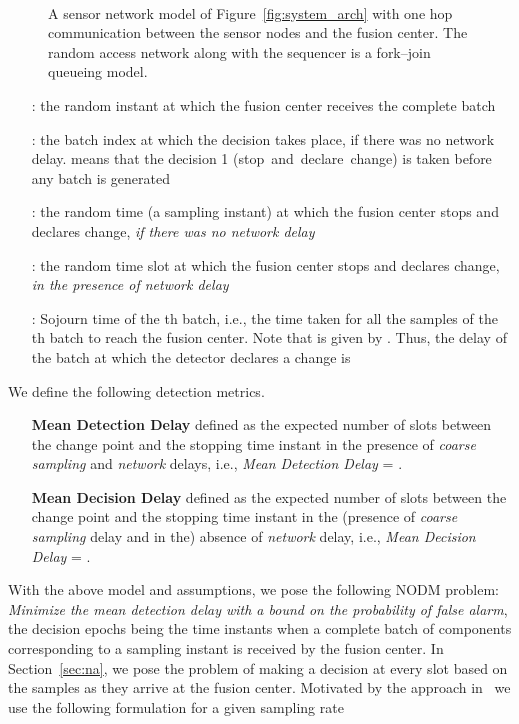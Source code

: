 \documentclass[acmtosn]{acmtrans2m}
\begin{document}
 \begin{figure}[t]
   \centering \
   \caption{A sensor network model of Figure~\ref{fig:system_arch} with
   one hop communication between the sensor nodes and the fusion center.
   The random access network along with the sequencer is a fork--join
   queueing model.}
   \label{fig:parallel_arch}
 \end{figure}
\vspace{5mm}

\begin{itemize}
\item[]{:} the random instant at which the fusion
    center receives the complete batch 

\item[]{:} the batch index at which the
    decision takes place, if there was no network delay. 
    means that the decision 1 ({\sf stop~and~declare~change}) is taken
    before any batch is generated

\item[]{:} the random time (a sampling
    instant) at which the fusion center stops and declares change, {\em if
    there was no network delay} 

\item[]{:} the random time slot at which the
    fusion center stops and declares change, {\em in the presence of
    network delay}

  \item[]{:} Sojourn time of the th batch, i.e., the
    time taken for all the samples of the th batch to reach the
    fusion center. Note that  is given by .
    Thus, the delay of the batch  at which the detector
    declares a change is 
\end{itemize}
    
We define the following detection metrics. 
\begin{itemize}
\item[{\bf Mean Detection Delay}] defined as the expected number of 
    slots between the change point  and the stopping time instant 
     in the presence of {\em coarse sampling} and 
    {\em network} delays,  i.e., {\em Mean Detection Delay} = 
    . 
\item[{\bf Mean Decision Delay}] defined as the expected number of 
    slots between the change point  and the stopping time instant 
     in the (presence of {\em coarse sampling} delay 
    and in the) absence of {\em network} delay, i.e., {\em Mean Decision Delay} 
    = . 
\end{itemize}
With the above model and assumptions, we pose the following {\sf NODM} problem:
\emph{Minimize the mean detection delay with a bound on the
  probability of false alarm}, the decision epochs being the time 
instants when a complete batch of  components corresponding to 
a sampling instant is received by the fusion center. In 
Section~\ref{sec:na}, we pose the problem of making a 
decision at every slot based on the samples as they arrive at  
the fusion center.
Motivated by the approach
in~\cite{veeravalli01decentralized-quickest} we use the following
formulation for a given sampling rate 
\end{document}
